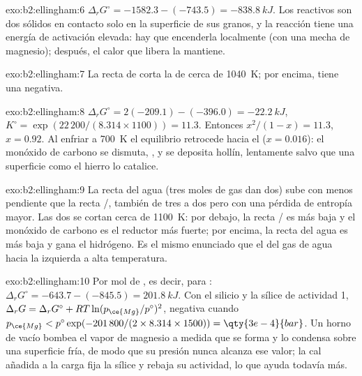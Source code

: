\begin{solution}{exo:b2:ellingham:6}
$\Delta_r G^\circ = -1582.3 - (-743.5) = \qty{-838.8}{kJ}$. Los reactivos son
dos sólidos en contacto solo en la superficie de sus granos, y la reacción
tiene una energía de activación elevada: hay que encenderla localmente (con una mecha de magnesio);
después, el calor que libera la mantiene.
\end{solution}

\begin{solution}{exo:b2:ellingham:7}
La recta de  corta la de  cerca de
\qty{1040}{K}; por encima,  tiene una  negativa.
\end{solution}

\begin{solution}{exo:b2:ellingham:8}
$\Delta_r G^\circ = 2(-209.1) - (-396.0) = \qty{-22.2}{kJ}$, $K^\circ =
\exp(22\,200/(8.314 \times 1100)) = 11.3$. Entonces $x^2/(1 - x) = 11.3$, $x =
0.92$. Al enfriar a \qty{700}{K} el equilibrio retrocede hacia el 
($x = 0.016$): el monóxido de carbono se dismuta, , y
se deposita hollín, lentamente salvo que una superficie como el hierro lo catalice.
\end{solution}

\begin{solution}{exo:b2:ellingham:9}
La recta del agua (tres moles de gas dan dos) sube con menos pendiente que la
recta /, también de tres a dos pero con una pérdida de entropía mayor. Las
dos se cortan cerca de \qty{1100}{K}: por debajo, la recta / es más baja y
el monóxido de carbono es el reductor más fuerte; por encima, la recta del agua es más baja y
gana el hidrógeno. Es el mismo enunciado que el  del gas de agua
 hacia la izquierda a alta temperatura.
\end{solution}

\begin{solution}{exo:b2:ellingham:10}
Por mol de , es decir, para : $\Delta_r
G^\circ = -643.7 - (-845.5) = \qty{+201.8}{kJ}$. Con el silicio y la sílice de
actividad 1, $\Delta_r G = \Delta_r G^\circ + RT\ln(p_{\ce{Mg}}/p^\circ)^2$, negativa
cuando $p_{\ce{Mg}} < p^\circ\exp(-201\,800/(2 \times 8.314 \times 1500)) =
\qty{3e-4}{bar}$. Un horno de vacío bombea el vapor de magnesio a medida que
se forma y lo condensa sobre una superficie fría, de modo que su presión nunca alcanza
ese valor; la cal añadida a la carga fija la sílice y rebaja su actividad,
lo que ayuda todavía más.
\end{solution}

